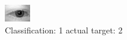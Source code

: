 \begin{figure}[h!]
\begin{center}
\includegraphics[width=0.60\columnwidth]{figures/ID404_class_1_target_2.png}
\end{center}
\caption{ Classification: 1 actual target: 2}
\label{fig:ID404_class_1_target_2}
\end{figure}
